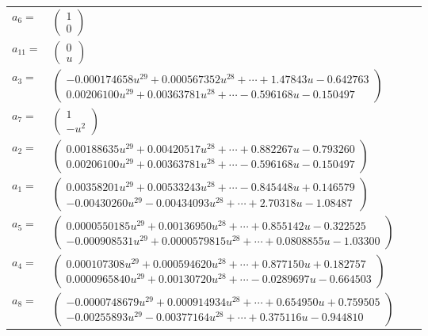 \documentclass[1p]{elsarticle_modified}
\theoremstyle{definition}
\begin{document}
\begin{tabular}{m{7pt} m{180pt} m{7pt} m{180pt} }
\flushright $a_{6}=$&$\begin{pmatrix}1\\0\end{pmatrix}$ \\
\flushright $a_{11}=$&$\begin{pmatrix}0\\u\end{pmatrix}$ \\
\flushright $a_{3}=$&$\begin{pmatrix}-0.000174658 u^{29}+0.000567352 u^{28}+\cdots+1.47843 u-0.642763\\0.00206100 u^{29}+0.00363781 u^{28}+\cdots-0.596168 u-0.150497\end{pmatrix}$ \\
\flushright $a_{7}=$&$\begin{pmatrix}1\\- u^2\end{pmatrix}$ \\
\flushright $a_{2}=$&$\begin{pmatrix}0.00188635 u^{29}+0.00420517 u^{28}+\cdots+0.882267 u-0.793260\\0.00206100 u^{29}+0.00363781 u^{28}+\cdots-0.596168 u-0.150497\end{pmatrix}$ \\
\flushright $a_{1}=$&$\begin{pmatrix}0.00358201 u^{29}+0.00533243 u^{28}+\cdots-0.845448 u+0.146579\\-0.00430260 u^{29}-0.00434093 u^{28}+\cdots+2.70318 u-1.08487\end{pmatrix}$ \\
\flushright $a_{5}=$&$\begin{pmatrix}0.0000550185 u^{29}+0.00136950 u^{28}+\cdots+0.855142 u-0.322525\\-0.000908531 u^{29}+0.0000579815 u^{28}+\cdots+0.0808855 u-1.03300\end{pmatrix}$ \\
\flushright $a_{4}=$&$\begin{pmatrix}0.000107308 u^{29}+0.000594620 u^{28}+\cdots+0.877150 u+0.182757\\0.0000965840 u^{29}+0.00130720 u^{28}+\cdots-0.0289697 u-0.664503\end{pmatrix}$ \\
\flushright $a_{8}=$&$\begin{pmatrix}-0.0000748679 u^{29}+0.000914934 u^{28}+\cdots+0.654950 u+0.759505\\-0.00255893 u^{29}-0.00377164 u^{28}+\cdots+0.375116 u-0.944810\end{pmatrix}$ \\

\end{tabular}
\end{document}
